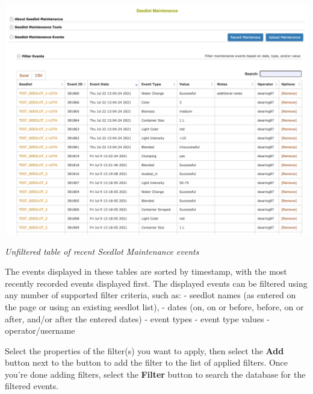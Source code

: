 \documentclass[
  12pt,
]{book}
\begin{document}
\begin{center}\includegraphics[width=0.95\linewidth]{assets/images/seedlot_maintenance_events_unfiltered} \end{center}

\emph{Unfiltered table of recent Seedlot Maintenance events}

The events displayed in these tables are sorted by timestamp, with the most recently recorded events displayed first. The displayed events can be filtered using any number of supported filter criteria, such as: - seedlot names (as entered on the page or using an existing seedlot list), - dates (on, on or before, before, on or after, and/or after the entered dates) - event types - event type values - operator/username

Select the properties of the filter(s) you want to apply, then select the \textbf{Add} button next to the button to add the filter to the list of applied filters. Once you're done adding filters, select the \textbf{Filter} button to search the database for the filtered events.
\end{document}
